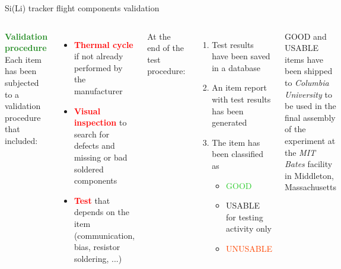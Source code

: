 \documentclass[aspectratio=169,xcolor=dvipsnames,handout]{beamer} %
\begin{document}
\begin{frame}{Si(Li) tracker flight components validation}
    \fontsize{8.5pt}{1}\selectfont
    \begin{columns}
        \textbf{\large \textcolor{ForestGreen}{Validation procedure}}\\
        \vspace{0.15cm}
        Each item has been subjected to a validation procedure that included:
        \begin{itemize}
            \item \textbf{\textcolor{Red}{Thermal cycle}} if not already performed by the manufacturer
            \item \textbf{\textcolor{Red}{Visual inspection}} to search for defects and missing or bad soldered components
            \item \textbf{\textcolor{Red}{Test}} that depends on the item (communication, bias, resistor soldering, ...)
        \end{itemize}

        \vspace{0.2cm}
        At the end of the test procedure:
        \begin{enumerate}
            \item Test results have been saved in a database
            \item An item report with test results has been generated
            \item The item has been classified as
            \begin{itemize}
                \item \textcolor{LimeGreen}{GOOD}
                \item \textcolor{BurntOrange}{USABLE for testing activity only}
                \item \textcolor{OrangeRed}{UNUSABLE}
            \end{itemize}
        \end{enumerate}

        \vspace{0.2cm}
        GOOD and USABLE items have been shipped to \textit{Columbia University} to be used in the final assembly of the experiment at the \textit{MIT Bates} facility in Middleton, Massachusetts
        

\end{columns}
\end{frame}
\end{document}
